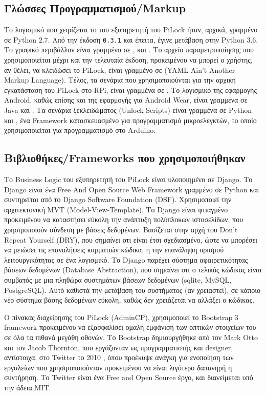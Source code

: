 	\subsection{Γλώσσες Προγραμματισμού/Markup}
		Το λογισμικό που χειρίζεται το  του εξυπηρετητή του PiLock ήταν, αρχικά, γραμμένο σε Python 2.7. Από την έκδοση \verb|0.3.1| και έπειτα, έγινε μετάβαση στην Python 3.6. Το γραφικό περιβάλλον είναι γραμμένο σε ,  και . Το αρχείο παραμετροποίησης που χρησιμοποιείται μέχρι και την τελευταία έκδοση, προκειμένου να μπορεί ο χρήστης, αν θέλει, να κλειδώσει το PiLock, είναι γραμμένο σε  (YAML Ain't Another Markup Language). Τέλος, τα σενάρια που χρησιμοποιούνται για την αρχική εγκατάσταση του PiLock στο RPi, είναι γραμμένα σε . Το λογισμικό της εφαρμογής Android, καθώς επίσης και της εφαρμογής για Android Wear, είναι γραμμένα σε Java και . Τα σενάρια ξεκλειδώματος (Unlock Scripts) είναι γραμμένα σε Python και , ένα Framework κατασκευασμένο για προγραμματισμό μικροελεγκτών, το οποίο χρησιμοποιείται για προγραμματισμό στο Arduino.

	\subsection{Βιβλιοθήκες/Frameworks που χρησιμοποιήθηκαν}
		\label{sub:fws}
		Το Business Logic του εξυπηρετητή του PiLock είναι υλοποιημένο σε Django. Το Django είναι ένα Free And Open Source Web Framework γραμμένο σε Python και συντηρείται από το Django Software Foundation (DSF). Χρησιμοποιεί την αρχιτεκτονική MVT (Model-View-Template). Το Django είναι φτιαγμένο προκειμένου να καταστήσει εύκολη την ανάπτυξη πολύπλοκων ιστοσελίδων, που χρησιμοποιούν σύνδεση με βάσεις δεδομένων. Βασίζεται στην αρχή του Don't Repeat Yourself (DRY), που σημαίνει οτι είναι έτσι σχεδιασμένο, ώστε να μπορέσει να μειώσει τις επαναλήψεις κομματιών κώδικα, η την επανάληψη ορισμού λειτουργικότητας σε ένα λογισμικό. Το Django παρέχει σύστημα αφαιρετικότητας βάσεων δεδομένων (Database Abstraction), που σημαίνει οτι ο τελικός κώδικας είναι συμβατός με μια πληθώρα συστημάτων βάσεων δεδομένων (sqlite, MySQL, PostgreSQL). Αυτό καθιστά την μετάβαση του συστήματος (αν χρειαστεί), σε κάποιο νέο σύστημα βάσης δεδομένων εύκολη, καθώς δεν χρειάζεται να αλλάξει ο κώδικας.

		Ο πίνακας διαχείρησης του PiLock (AdminCP), χρησιμοποιεί το Bootstrap 3 framework προκειμένου να εξασφαλίσει ομαλή έμφάνιση των οπτικών στοιχείων του σε όλα τα πιθανά μεγάθη οθονών. Το Bootstrap δημιουργήθηκε από τον Mark Otto και τον Jacob Thornton, που εργάζονταν ως προγραμματιστής και designer, αντίστοιχα, στο Twitter το 2010 \textsuperscript{\cite{BS_about}}, όπου προέκυψε ανάγκη για ενοποίηση των εργαλείων που χρησιμοποιούνταν προκειμένου να είναι λιγότερο δαπανηρή η συντήρηση. Το Twitter είναι ένα Free and Open Source έργο, και διανείμεται υπό την άδεια MIT.
 		
